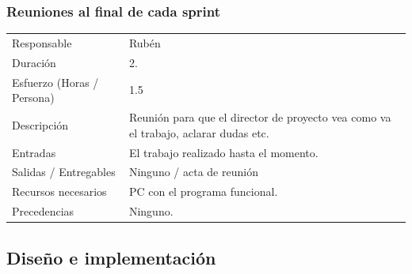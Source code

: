 \subsubsection{Reuniones al final de cada sprint}
\begin{table}[H]
    \begin{center}
        \begin{tabular}{l p{8cm}}
            Responsable                           & Rub\'{e}n \\
            Duraci\'{o}n                          & 2. \\ 
            Esfuerzo (Horas / Persona)            & 1.5 \\
            Descripci\'{o}n                       & Reuni\'{o}n para que el director de proyecto vea como va el trabajo,
                                                    aclarar dudas etc. \\
            Entradas                              & El trabajo realizado hasta el momento.\\
            Salidas / Entregables                 & Ninguno / acta de reuni\'{o}n \\
            Recursos necesarios                   & PC con el programa funcional. \\
            Precedencias                          & Ninguno. \\
        \end{tabular}
    \end{center}
    
\end{table}

\subsection{Dise\~{n}o e implementaci\'{o}n}
